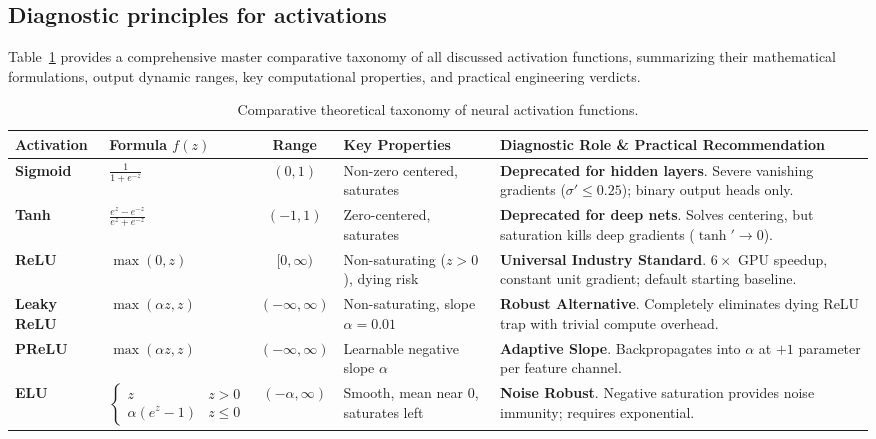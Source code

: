 \subsection{Diagnostic principles for activations}
\label{sec:activation_empirical_benchmark}

Table~\ref{tab:activation_functions_master_comparison} provides a comprehensive master comparative taxonomy of all discussed activation functions, summarizing their mathematical formulations, output dynamic ranges, key computational properties, and practical engineering verdicts.

\begin{table}[H]
\centering
\small
\caption{Comparative theoretical taxonomy of neural activation functions.}
\label{tab:activation_functions_master_comparison}
\begin{tabularx}{\textwidth}{l l c p{3.8cm} X}
\toprule
\textbf{Activation} & \textbf{Formula $f(z)$} & \textbf{Range} & \textbf{Key Properties} & \textbf{Diagnostic Role \& Practical Recommendation} \\
\midrule
\textbf{Sigmoid} & $\frac{1}{1 + e^{-z}}$ & $(0, 1)$ & Non-zero centered, saturates & \textbf{Deprecated for hidden layers}. Severe vanishing gradients ($\sigma' \le 0.25$); binary output heads only. \\
\addlinespace
\textbf{Tanh} & $\frac{e^z - e^{-z}}{e^z + e^{-z}}$ & $(-1, 1)$ & Zero-centered, saturates & \textbf{Deprecated for deep nets}. Solves centering, but saturation kills deep gradients ($\tanh' \to 0$). \\
\addlinespace
\textbf{ReLU} & $\max(0, z)$ & $[0, \infty)$ & Non-saturating ($z>0$), dying risk & \textbf{Universal Industry Standard}. $6\times$ GPU speedup, constant unit gradient; default starting baseline. \\
\addlinespace
\textbf{Leaky ReLU} & $\max(\alpha z, z)$ & $(-\infty, \infty)$ & Non-saturating, slope $\alpha = 0.01$ & \textbf{Robust Alternative}. Completely eliminates dying ReLU trap with trivial compute overhead. \\
\addlinespace
\textbf{PReLU} & $\max(\alpha z, z)$ & $(-\infty, \infty)$ & Learnable negative slope $\alpha$ & \textbf{Adaptive Slope}. Backpropagates into $\alpha$ at $+1$ parameter per feature channel. \\
\addlinespace
\textbf{ELU} & $\begin{cases} z & z > 0 \\ \alpha(e^z - 1) & z \le 0 \end{cases}$ & $(-\alpha, \infty)$ & Smooth, mean near 0, saturates left & \textbf{Noise Robust}. Negative saturation provides noise immunity; requires exponential. \\

\end{tabularx}
\end{table}
